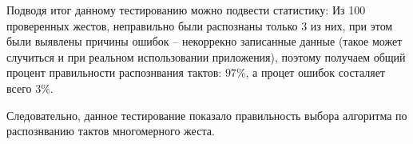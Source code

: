 Подводя итог данному тестированию можно подвести статистику:
Из 100 проверенных жестов, неправильно были распознаны только 3 из них, при этом были выявлены причины ошибок -- некоррекно записанные данные (такое может случиться и при реальном использовании приложения), поэтому получаем общий процент правильности распознвания тактов: $97 \%$, а процет ошибок состаляет всего $3 \%$.

Следовательно, данное тестирование показало правильность выбора алгоритма по распознванию тактов многомерного жеста.
